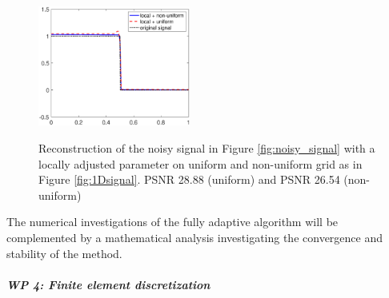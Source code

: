 \documentclass[enabledeprecatedfontcommands,cleardoublepage=empty,headsepline,twoside,11pt,DIV=15,BCOR=12mm,final]{scrartcl}
\begin{document}
\begin{figure}[h!]
\begin{center}
{\includegraphics[width=5cm]{Comparison_uniform_nonuniform_mesh_average}}
\caption{Reconstruction of the noisy signal in Figure \ref{fig:noisy_signal} with a locally adjusted parameter on uniform and non-uniform grid as in Figure \ref{fig:1Dsignal}. PSNR 28.88 (uniform) and PSNR 26.54 (non-uniform)}\label{fig:PSNR}
\end{center}
\end{figure}
 
 The numerical investigations of the fully adaptive algorithm will be complemented by a mathematical analysis investigating the convergence and stability of the method. 
 
 \subparagraph{WP 4: Finite element discretization}
 
\end{document}

